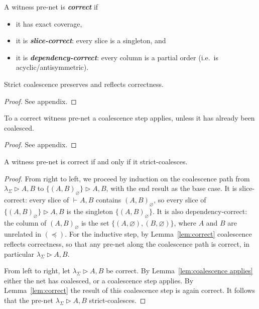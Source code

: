 \documentclass[UKenglish]{lipics-v2016}
\theoremstyle{plain}
\newcommand\defn[1]{\textit{\textbf{#1}}}
\newcommand\+{+}
\renewcommand\*{\times}
\newcommand\dep{\preccurlyeq}
\newcommand\seq[3][]{{\vdash_{#1}}#2,#3}
\newcommand\net[3]{#1\triangleright #2,#3}
\newcommand\link[3][\sigma]{(#2,#3)_{#1}}
\begin{document}
%
\begin{definition}
A witness pre-net is \defn{correct} if
\begin{itemize}
\item it has exact coverage,
\item it is \defn{slice-correct}: every slice is a singleton, and
\item it is \defn{dependency-correct}: every column is a partial order (i.e.\ is acyclic/antisymmetric).
\end{itemize}
\end{definition}

\setcounter{lemcorrect}{\thetheorem}
\begin{lemma}
\label{lem:correct}
Strict coalescence preserves and reflects correctness.
\end{lemma}

\begin{proof}
See appendix.
\end{proof}

\setcounter{lemcoalescenceapplies}{\thetheorem}
\begin{lemma}
\label{lem:coalescence applies}
To a correct witness pre-net a coalescence step applies, unless it has already been coalesced.
\end{lemma}

\begin{proof}
See appendix.
\end{proof}

\begin{theorem}
\label{thm:correctness}
A witness pre-net is correct if and only if it strict-coalesces. 
\end{theorem}

\begin{proof}
From right to left, we proceed by induction on the coalescence path from $\net{\lambda_\Sigma}AB$ to $\net{\{\link[\varnothing]AB\}}AB$, with the end result as the base case. It is slice-correct: every slice of $\seq AB$ contains $\link[\varnothing]AB$, so every slice of $\net{\{\link[\varnothing]AB\}}AB$ is the singleton $\{\link[\varnothing]AB\}$. It is also dependency-correct: the column of $\link[\varnothing]AB$ is the set $\{(A,\varnothing),(B,\varnothing)\}$, where $A$ and $B$ are unrelated in $(\dep)$. For the inductive step, by Lemma~\ref{lem:correct} coalescence reflects correctness, so that any pre-net along the coalescence path is correct, in particular $\net{\lambda_\Sigma}AB$.

From left to right, let $\net{\lambda_\Sigma}AB$ be correct. By Lemma~\ref{lem:coalescence applies} either the net has coalesced, or a coalescence step applies. By Lemma~\ref{lem:correct} the result of this coalescence step is again correct. It follows that the pre-net $\net{\lambda_\Sigma}AB$ strict-coalesces.
\end{proof}
\end{document}
